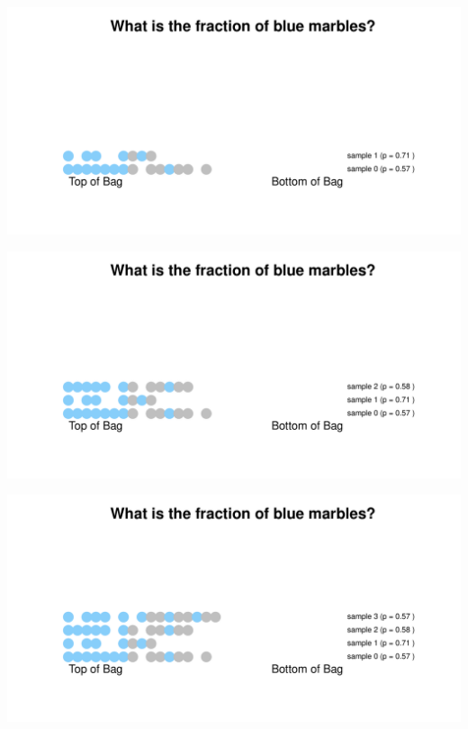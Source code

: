 \documentclass[aspectratio=169]{beamer}
\theoremstyle{principle}
\begin{document}
\begin{frame}
\begin{center}
\includegraphics[scale=0.57]{bias_sample_1.pdf}
\end{center}
\end{frame}

\begin{frame}
\begin{center}
\includegraphics[scale=0.57]{bias_sample_2.pdf}
\end{center}
\end{frame}

\begin{frame}
\begin{center}
\includegraphics[scale=0.57]{bias_sample_3.pdf}
\end{center}
\end{frame}
\end{document}
